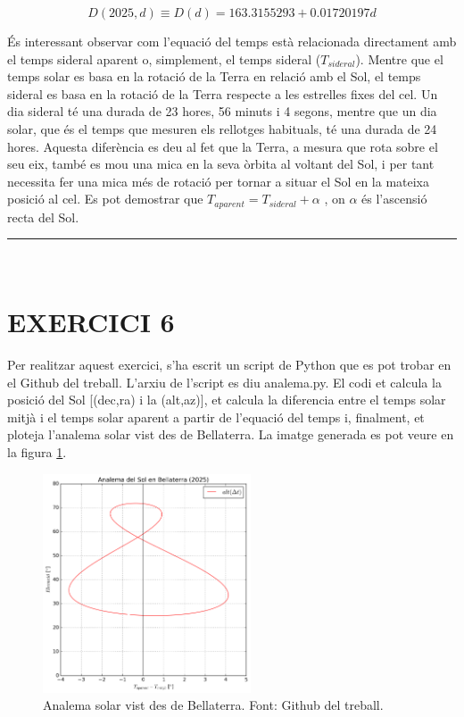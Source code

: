 \documentclass[a4paper, 11pt]{article}
\begin{document}
\begin{equation} \label{D_2025}
    \boxed{D(2025,d) \equiv D(d) = 163.3155293 + 0.01720197d}
\end{equation}
\vspace{2mm}

\noindent És interessant observar com l'equació del temps està relacionada directament amb el temps sideral aparent o, simplement, el temps sideral ($T_{sideral}$). Mentre que el temps solar es basa en la rotació de la Terra en relació amb el Sol, el temps sideral es basa en la rotació de la Terra respecte a les estrelles fixes del cel. Un dia sideral té una durada de 23 hores, 56 minuts i 4 segons, mentre que un dia solar, que és el temps que mesuren els rellotges habituals, té una durada de 24 hores. Aquesta diferència es deu al fet que la Terra, a mesura que rota sobre el seu eix, també es mou una mica en la seva òrbita al voltant del Sol, i per tant necessita fer una mica més de rotació per tornar a situar el Sol en la mateixa posició al cel. Es pot demostrar que $T_{aparent} = T_{sideral} + \alpha$ \cite{EQ_OF_TIME}, on $\alpha$ és l'ascensió recta del Sol.  

\vspace{10mm}
\hrule\
\vspace{5mm}


\section*{EXERCICI 6}

\noindent Per realitzar aquest exercici, s'ha escrit un script de Python que es pot trobar en el Github del treball. L'arxiu de l'script es diu analema.py. El codi et calcula la posició del Sol [(dec,ra) i la (alt,az)], et calcula la diferencia entre el temps solar mitjà i el temps solar aparent a partir de l'equació del temps i, finalment, et ploteja l'analema solar vist des de Bellaterra. La imatge generada es pot veure en la figura \ref{fig:analema_alt}.

\begin{figure}[h!]
    \centering
    \includegraphics[width=0.55\textwidth]{images/analema_alt.png}
    \caption{Analema solar vist des de Bellaterra. Font: Github del treball.}
    \label{fig:analema_alt}
\end{figure}
\vspace{2mm}
\end{document}

